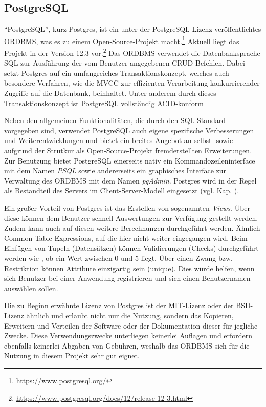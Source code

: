 \subsection{PostgreSQL}
\label{ssec:PostgreSQL}

\enquote{PostgreSQL}, kurz Postgres, ist ein unter der PostgreSQL Lizenz\autocite{rf-psqllicense} veröffentlichtes \ac{ORDBMS}, was es zu einem Open-Source-Projekt macht.\footnote{\url{https://www.postgresql.org/}} 
Aktuell liegt das Projekt in der Version 12.3 vor.\footnote{\url{https://www.postgresql.org/docs/12/release-12-3.html}} 
Das \ac{ORDBMS} verwendet die Datenbanksprache \ac{SQL} zur Ausführung der vom Benutzer angegebenen \ac{CRUD}-Befehlen.\todo{!} %
Dabei setzt Postgres auf ein umfangreiches Transaktionskonzept, welches auch besondere Verfahren, wie die \ac*{MVCC} zur effizienten Verarbeitung konkurrierender Zugriffe auf die Datenbank, beinhaltet.
Unter anderem durch dieses Transaktionskonzept ist PostgreSQL vollständig \ac*{ACID}-konform \todo{!} %

Neben den allgemeinen Funktionalitäten, die durch den \ac{SQL}-Standard vorgegeben sind, verwendet PostgreSQL auch eigene spezifische Verbesserungen und Weiterentwicklungen und bietet ein breites Angebot an selbst- sowie aufgrund der Strutkur als Open-Source-Projekt fremderstellten Erweiterungen.
Zur Benutzung bietet PostgreSQL einerseits nativ ein Kommandozeileninterface mit dem Namen \emph{PSQL} sowie andererseits ein graphisches Interface zur Verwaltung des \ac{ORDBMS} mit dem Namen \emph{pgAdmin}.
Postgres wird in der Regel als Bestandteil des Servers im Client-Server-Modell eingesetzt (vgl. Kap. ).

Ein großer Vorteil von Postgres ist das Erstellen von sogenannten \emph{Views}. 
Über diese können dem Benutzer schnell Auswertungen zur Verfügung gestellt werden. 
Zudem kann auch auf diesen weitere Berechnungen durchgeführt werden. Ähnlich Common Table Expressions, auf die hier nicht weiter eingegangen wird. \newline
Beim Einfügen von Tupeln (Datensätzen) können Validierungen (Checks) durchgeführt werden wie \zb, ob ein Wert zwischen 0 und 5 liegt. 
Über einen Zwang bzw. Restriktion  können Attribute einzigartig sein (unique). 
Dies würde \ua helfen, wenn sich Benutzer bei einer Anwendung registrieren und sich einen Benutzernamen auswählen sollen. 


Die zu Beginn erwähnte Lizenz von Postgres ist der MIT-Lizenz oder der BSD-Lizenz\todo{!} ähnlich und erlaubt nicht nur die Nutzung, sondern das Kopieren, Erweitern und Verteilen der Software oder der Dokumentation dieser für jegliche Zwecke. %
Diese Verwendungszwecke unterliegen keinerlei Auflagen und erfordern ebenfalls keinerlei Abgaben von Gebühren, weshalb das \ac{ORDBMS} sich für die Nutzung in diesem Projekt sehr gut eignet.\autocite{rf-psqllicense}
